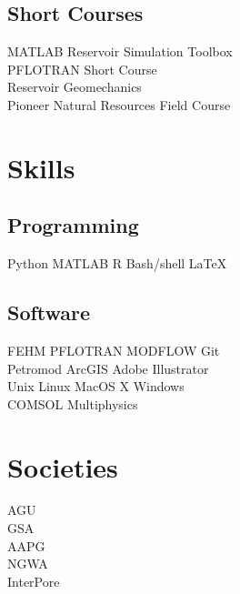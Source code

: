 \documentclass[]{deedy-resume-openfont}
\begin{document}
\begin{minipage}[t]{0.33\textwidth}
\subsection{Short Courses}
MATLAB Reservoir Simulation Toolbox \\
PFLOTRAN Short Course \\
Reservoir Geomechanics \\
Pioneer Natural Resources Field Course


\section{Skills}
\subsection{Programming}
Python 
\textbullet{} MATLAB 
\textbullet{} R 
\textbullet{} Bash/shell
\textbullet{} \LaTeX

\subsection{Software}
FEHM 
\textbullet{} PFLOTRAN 
\textbullet{} MODFLOW
\textbullet{} Git 
\\ Petromod
\textbullet{} ArcGIS 
\textbullet{} Adobe Illustrator
\\ Unix \textbullet{} Linux \textbullet{} MacOS X \textbullet{} Windows
\\ COMSOL Multiphysics


\section{Societies}
AGU\\
GSA\\
AAPG\\
NGWA\\
InterPore
\sectionsep

%
%
\end{minipage}
\hfill
\end{document}
